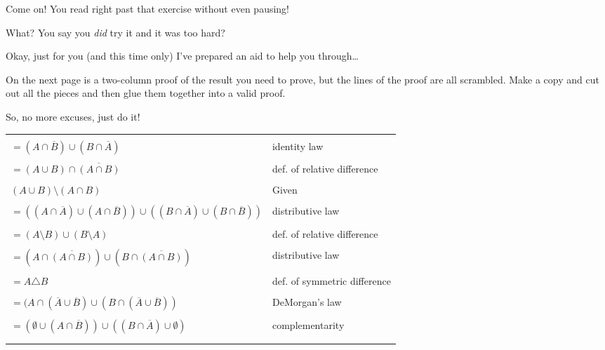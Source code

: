 \documentclass[10pt,]{book}
\theoremstyle{plain}
\theoremstyle{definition}
\theoremstyle{definition}
\numberwithin{equation}{section}
\newcommand{\hrulethin}  {\noalign{\hrule height 0.04em}}
\begin{document}
    Come on! You read right past that exercise without even pausing!
\par

    What? You say you \emph{did} try it and it was too hard?
\par

    Okay, just for you (and this time only) I've prepared an aid to
    help you through\dots{}
\par

    On the next page is a two-column proof of the result you need to
    prove, but the lines of the proof are all scrambled.
    Make a copy and cut out all the pieces and then glue them together
    into a valid proof.
\par

    So, no more excuses, just do it!
\begin{tabular}{ll}
&\tabularnewline\hrulethin
\(= (A \cap \overline{B}) \cup (B \cap \overline{A})\)&identity law\tabularnewline[0pt]
&\tabularnewline\hrulethin
\(= (A \cup B) \cap \overline{(A \cap B)}\)&def. of relative difference\tabularnewline[0pt]
&\tabularnewline\hrulethin
\((A \cup B) \setminus (A \cap B)\)&Given\tabularnewline[0pt]
&\tabularnewline\hrulethin
\(= ((A \cap \overline{A}) \cup (A \cap \overline{B})) \cup ((B \cap \overline{A}) \cup (B \cap \overline{B}))\)&distributive law\tabularnewline[0pt]
&\tabularnewline\hrulethin
\(= (A \setminus B) \cup (B \setminus A)\)&def. of relative difference\tabularnewline[0pt]
&\tabularnewline\hrulethin
\(= (A \cap \overline{(A \cap B)}) \cup (B \cap \overline{(A \cap B)})\)&distributive law\tabularnewline[0pt]
&\tabularnewline\hrulethin
\(= A \triangle B\)&def. of symmetric difference\tabularnewline[0pt]
&\tabularnewline\hrulethin
\(= (A \cap (\overline{A} \cup \overline{B}) \cup (B \cap (\overline{A} \cup \overline{B}))\)&DeMorgan's law\tabularnewline[0pt]
&\tabularnewline\hrulethin
\(= (\emptyset \cup (A \cap \overline{B})) \cup ((B \cap \overline{A}) \cup \emptyset)\)&complementarity\tabularnewline[0pt]
&\tabularnewline\hrulethin
\end{tabular}
\typeout{************************************************}
\typeout{************************************************}
\end{document}
